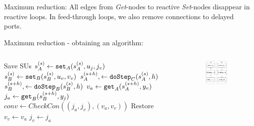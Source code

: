 \documentclass{beamer}
\begin{document}
\begin{frame}{Maximum reduction:}
    All edges from \textit{Get}-nodes to reactive \textit{Set}-nodes disappear in reactive loops.
    In feed-through loops, we also remove connections to delayed ports.  
    
\end{frame}

\begin{frame}{Maximum reduction - obtaining an algorithm:}
    \begin{columns}[T] %
        \begin{column}{.48\textwidth}
            \begin{algorithm}[H]
                \begin{algorithmic}
                  \scriptsize
                  \State Save SUs   
                  \State $s_{A}^{(s)} \gets \mathtt{set}_{A}(s_{A}^{(s)}, u_{j}, j_v)$
                  \State $s_{B}^{(s)} \gets \mathtt{set}_{B}(s_{B}^{(s)}, u_{v}, v_v)$
                  \State $s_{A}^{(s+h)}, \gets \mathtt{doStep}_{C}(s_{A}^{(s)}, h)$
                  \State $s_{B}^{(s+h)}, \gets \mathtt{doStep}_{B}(s_{B}^{(s)}, h)$
                  \State $v_a \gets \mathtt{get}_{A}(s_{A}^{(s+h)}, y_{v})$
                  \State $j_a \gets \mathtt{get}_{B}(s_{B}^{(s+h)}, y_{j})$
                  \State $conv \gets CheckCon((j_a, j_v),(v_a, v_v))$
                      \State Restore     
                  \EndIf
                  \State $v_v \gets v_a$
                  \State $j_v \gets j_a$
              \EndWhile
              \end{algorithmic}
              \caption{}
              \end{algorithm}
    \end{column}%
    \hfill%
    \begin{column}{.48\textwidth}
        \begin{figure}    
            \includegraphics[width=0.8\textwidth]{images/jacobian_reduced_graph.pdf}

\end{figure}
\end{column}
\end{columns}
\end{frame}
\end{document}
